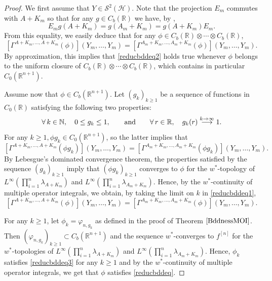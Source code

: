 \documentclass[12pt]{amsart}
\theoremstyle{remark}
\newcommand{\N}{\mbox{${\mathbb N}$}}
\begin{document}
\begin{proof}
We first assume that $Y\in \mathcal{S}^2(\mathcal{H})$. Note that the projection $E_m$ commutes with $A + K_m$ so that for any $g\in C_b(\mathbb{R})$ we have, by \cite[(7.25)]{KPSS},
$$
E_m g(A + K_m) = g(A_m + K_m) = g(A + K_m) E_m .
$$
From this equality, we easily deduce that for any $\phi \in C_b(\mathbb{R}) \otimes \cdots \otimes C_b(\mathbb{R})$,
\begin{equation}\label{reducbddeq2}
\left[\Gamma^{A+K_m, \ldots, A+K_m}(\phi) \right](Y_m, \ldots, Y_m) 
= \left[\Gamma^{A_m+K_m, \ldots, A_m+K_m}(\phi) \right](Y_m, \ldots, Y_m).
\end{equation}
By approximation, this implies that \eqref{reducbddeq2} holds true whenever $\phi$ belongs to the uniform closure of $C_b(\mathbb{R})\otimes \cdots \otimes  C_b(\mathbb{R})$, which contains in particular $C_0(\mathbb{R}^{n+1})$.

Assume now that $\phi \in C_b(\mathbb{R}^{n+1})$. Let
$(g_k)_{k\geq 1}$ be a sequence of functions in
$C_0(\mathbb{R})$ satisfying the following two properties:
$$
\forall\, k\in\N, \quad 0\leq g_k\leq 1,
\qquad\hbox{and}\qquad\forall\, r\in \mathbb{R},\quad
g_k(r)\overset{k\to\infty}{\longrightarrow} 1.
$$
For any $k\geq 1, \phi g_k \in C_0(\mathbb{R}^{n+1})$, so the latter implies that
\begin{equation}\label{reducbddeq1}
\left[\Gamma^{A+K_m, \ldots, A+K_m}(\phi g_k) \right](Y_m, \ldots, Y_m) 
= \left[\Gamma^{A_m+K_m, \ldots, A_m+K_m}(\phi g_k) \right](Y_m, \ldots, Y_m).
\end{equation}
By Lebesgue's dominated convergence theorem, the properties satisfied by the sequence $(g_k)_{k\geq 1}$ imply that $(\phi g_k)_{k\geq 1}$ converges to $\phi$ for the $w^*$-topology of $L^{\infty}\left(\prod_{i=1}^n \lambda_{A + K_m}\right)$ and $L^{\infty}\left(\prod_{i=1}^n \lambda_{A_m + K_m}\right)$. Hence, by the $w^*$-continuity of multiple operator integrals, we obtain, by taking the limit on $k$ in \eqref{reducbddeq1},
\begin{equation}\label{reducbddeq3}
\left[\Gamma^{A+K_m, \ldots, A+K_m}(\phi) \right](Y_m, \ldots, Y_m) 
= \left[\Gamma^{A_m+K_m, \ldots, A_m+K_m}(\phi) \right](Y_m, \ldots, Y_m).
\end{equation}

For any $k\geq 1$, let $\phi_k = \varphi_{n,g_k}$ as defined in the proof of Theorem $\ref{BddnessMOI}$. Then $(\varphi_{n,g_k})_{k\geq 1} \subset C_b(\mathbb{R}^{n+1})$ and the sequence $w^*$-converges to $f^{[n]}$ for the $w^*$-topologies of $L^{\infty}\left(\prod_{i=1}^n \lambda_{A + K_m}\right)$ and $L^{\infty}\left(\prod_{i=1}^n \lambda_{A_m + K_m}\right)$. Hence, $\phi_k$ satisfies \eqref{reducbddeq3} for any $k\geq 1$ and by the $w^*$-continuity of multiple operator integrals, we get that $\phi$ satisfies \eqref{reducbddeq}. 


\end{proof}
\end{document}
